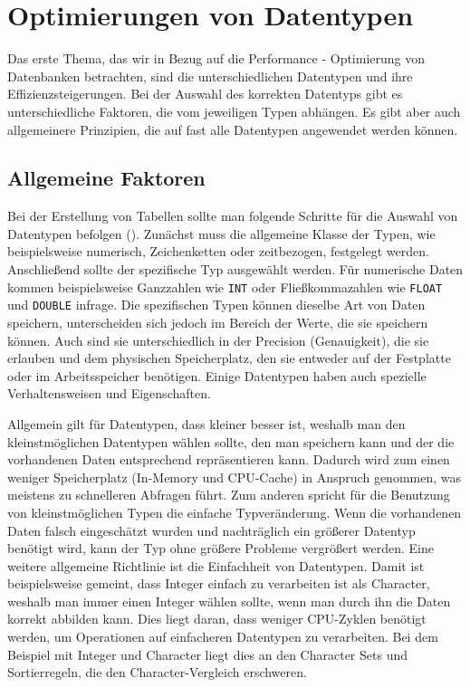 
\chapter{Optimierungen von Datentypen}\label{ch:data-types}

Das erste Thema, das wir in Bezug auf die Performance - Optimierung von Datenbanken betrachten, sind die unterschiedlichen Datentypen und ihre Effizienzsteigerungen.
Bei der Auswahl des korrekten Datentyps gibt es unterschiedliche Faktoren, die vom jeweiligen Typen abhängen.
Es gibt aber auch allgemeinere Prinzipien, die auf fast alle Datentypen angewendet werden können.

\section{Allgemeine Faktoren}\label{sec:data-types-allgemeine-faktoren}

Bei der Erstellung von Tabellen sollte man folgende Schritte für die Auswahl von Datentypen befolgen (\cite[pp. 115--145]{schwartz2012high}).
Zunächst muss die allgemeine Klasse der Typen, wie beispielsweise numerisch, Zeichenketten oder zeitbezogen, festgelegt werden.
Anschließend sollte der spezifische Typ ausgewählt werden.
Für numerische Daten kommen beispielsweise Ganzzahlen wie \texttt{INT} oder Fließkommazahlen wie \texttt{FLOAT} und \texttt{DOUBLE} infrage.
Die spezifischen Typen können dieselbe Art von Daten speichern, unterscheiden sich jedoch im Bereich der Werte, die sie speichern können.
Auch sind sie unterschiedlich in der Precision (Genauigkeit), die sie erlauben und dem physischen Speicherplatz, den sie entweder auf der Festplatte oder im Arbeitsspeicher benötigen.
Einige Datentypen haben auch spezielle Verhaltensweisen und Eigenschaften.

Allgemein gilt für Datentypen, dass kleiner besser ist, weshalb man den kleinstmöglichen Datentypen wählen sollte, den man speichern kann und der die vorhandenen Daten entsprechend repräsentieren kann.
Dadurch wird zum einen weniger Speicherplatz (In-Memory und CPU-Cache) in Anspruch genommen, was meistens zu schnelleren Abfragen führt.
Zum anderen spricht für die Benutzung von kleinstmöglichen Typen die einfache Typveränderung.
Wenn die vorhandenen Daten falsch eingeschätzt wurden und nachträglich ein größerer Datentyp benötigt wird, kann der Typ ohne größere Probleme vergrößert werden.
Eine weitere allgemeine Richtlinie ist die Einfachheit von Datentypen.
Damit ist beispielsweise gemeint, dass Integer einfach zu verarbeiten ist als Character, weshalb man immer einen Integer wählen sollte, wenn man durch ihn die Daten korrekt abbilden kann.
Dies liegt daran, dass weniger CPU-Zyklen benötigt werden, um Operationen auf einfacheren Datentypen zu verarbeiten.
Bei dem Beispiel mit Integer und Character liegt dies an den Character Sets und Sortierregeln, die den Character-Vergleich erschweren.

